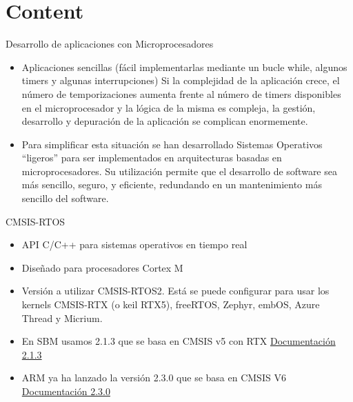 \section{Content}

\begin{frame}{Desarrollo de aplicaciones con Microprocesadores}
    \begin{itemize}
        \item Aplicaciones sencillas (fácil implementarlas mediante un bucle while, algunos timers y algunas interrupciones)
Si la complejidad de la aplicación crece, el número de temporizaciones aumenta frente al número de timers disponibles en el microprocesador y la lógica de la misma es compleja, la gestión, desarrollo y depuración de la aplicación se complican enormemente.
        \item Para simplificar esta situación se han desarrollado Sistemas Operativos “ligeros” para ser implementados en arquitecturas basadas en microprocesadores. Su utilización permite que el desarrollo de software sea más sencillo, seguro, y eficiente, redundando en un mantenimiento más sencillo del software.      
    \end{itemize}
     \centering

\end{frame}


\begin{frame}{CMSIS-RTOS}
    \begin{itemize}
      \item API C/C++ para sistemas operativos en tiempo real
      \item Diseñado para procesadores Cortex M
      \item Versión a utilizar CMSIS-RTOS2. Está se puede configurar para usar los kernels CMSIS-RTX (o keil RTX5), freeRTOS, Zephyr, embOS, Azure Thread y Micrium.
      \item En SBM usamos 2.1.3 que se basa en CMSIS v5 con RTX \href{https://arm-software.github.io/CMSIS_5/RTOS2/html/index.html}{Documentación 2.1.3}
      \item ARM ya ha lanzado la versión 2.3.0 que se basa en CMSIS V6 \href{https://arm-software.github.io/CMSIS_6/latest/RTOS2/group__CMSIS__RTOS__ThreadMgmt.html}{Documentación 2.3.0}
    \end{itemize}
    
\end{frame}

